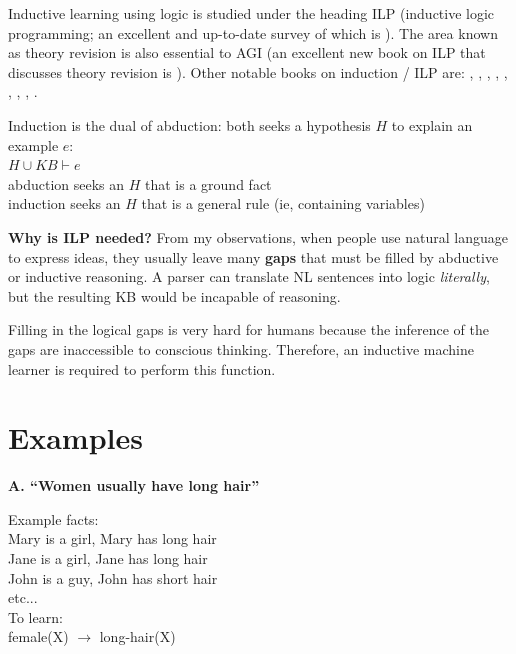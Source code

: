 Inductive learning using logic is studied under the heading ILP (inductive logic programming; an excellent and up-to-date survey of which is \citep*{Konstantopoulos2008}).  The area known as theory revision is also essential to AGI (an excellent new book on ILP that discusses theory revision is \citep*{DeRaedt2008}).  Other notable books on induction / ILP are: \citep*{Holland1986}, \citep*{Muggleton1992}, \citep*{Lavrac1994}, \citep*{Bergadano1996}, \citep*{Nienhuys-Cheng1997}, \citep*{Flach2000}, \citep*{Lloyd2003}, \citep*{Getoor2007}, \citep*{DeRaedt2008}.

Induction is the dual of abduction:  both seeks a hypothesis $H$ to explain an example $e$:\\
\hspace*{1cm} $H \cup KB \vdash e$\\
\hspace*{1cm} abduction seeks an $H$ that is a ground fact\\
\hspace*{1cm} induction seeks an $H$ that is a general rule (ie, containing variables)

\textbf{Why is ILP needed?}  From my observations, when people use natural language to express ideas, they usually leave many \textbf{gaps} that must be filled by abductive or inductive reasoning.  A parser can translate NL sentences into logic \textit{literally}, but the resulting KB would be incapable of reasoning.

Filling in the logical gaps is very hard for humans because the inference of the gaps are inaccessible to conscious thinking.  Therefore, an inductive machine learner is required to perform this function.

\section{Examples}

\textbf{A. ``Women usually have long hair''}

Example facts:\\
\hspace*{1cm} Mary is a girl, Mary has long hair\\
\hspace*{1cm} Jane is a girl, Jane has long hair\\
\hspace*{1cm} John is a guy, John has short hair\\
\hspace*{1cm} etc...\\
To learn:\\
\hspace*{1cm} female(X) $\rightarrow$ long-hair(X)\\

